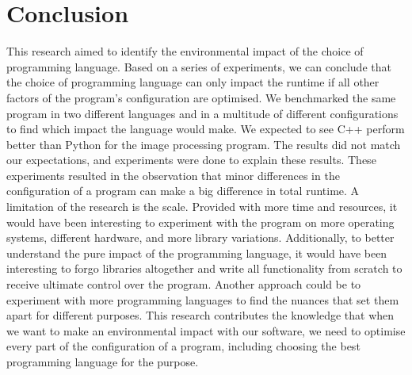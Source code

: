\chapter{Conclusion}
This research aimed to identify the environmental impact of the choice of programming language. Based on a series of experiments, we can conclude that the choice of programming language can only impact the runtime if all other factors of the program's configuration are optimised.
We benchmarked the same program in two different languages and in a multitude of different configurations to find which impact the language would make. We expected to see C++ perform better than Python for the image processing program. The results did not match our expectations, and experiments were done to explain these results. These experiments resulted in the observation that minor differences in the configuration of a program can make a big difference in total runtime.
A limitation of the research is the scale. Provided with more time and resources, it would have been interesting to experiment with the program on more operating systems, different hardware, and more library variations. Additionally, to better understand the pure impact of the programming language, it would have been interesting to forgo libraries altogether and write all functionality from scratch to receive ultimate control over the program. Another approach could be to experiment with more programming languages to find the nuances that set them apart for different purposes.
This research contributes the knowledge that when we want to make an environmental impact with our software, we need to optimise every part of the configuration of a program, including choosing the best programming language for the purpose.
